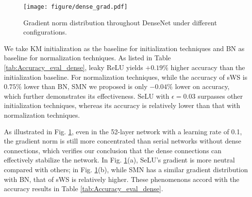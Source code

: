 \documentclass[10pt,journal,compsoc]{IEEEtran}
\begin{document}
\begin{figure}[ht]
\centering
\texttt{[image: figure/dense\_grad.pdf]}
\caption{Gradient norm distribution throughout DenseNet under different configurations.}
\label{fig:densenet_grad}
\vspace{-20pt}
\end{figure}

We take KM initialization as the baseline for initialization techniques and BN as baseline for normalization techniques. As listed in Table \ref{tab:Accuracy_eval_dense}, leaky ReLU yields $+0.19\%$ higher accuracy than the initialization baseline. For normalization techniques, while the accuracy of sWS is $0.75\%$ lower than BN, SMN we proposed is only $-0.04\%$ lower on accuracy, which further demonstrates its effectiveness. SeLU with $\epsilon=0.03$ surpasses other initialization techniques, whereas its accuracy is relatively lower than that with normalization techniques.

As illustrated in Fig. \ref{fig:densenet_grad}, even in the 52-layer network with a learning rate of 0.1, the gradient norm is still more concentrated than serial networks without dense connections, which verifies our conclusion that the dense connections can effectively stabilize the network. In Fig. \ref{fig:densenet_grad}(a), SeLU's gradient is more neutral compared with others; in Fig. \ref{fig:densenet_grad}(b), while SMN has a similar gradient distribution with BN, that of sWS is relatively higher. These phenomenons accord with the accuracy results in Table \ref{tab:Accuracy_eval_dense}. 
\end{document}
